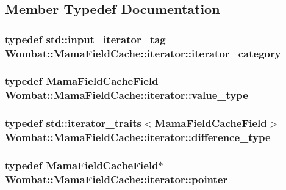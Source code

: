 \subsection{Member Typedef Documentation}
\hypertarget{classWombat_1_1MamaFieldCache_1_1iterator_ab9a965491e48470861289df0bb701009}{
\subsubsection[{iterator\_\-category}]{\setlength{\rightskip}{0pt plus 5cm}typedef std::input\_\-iterator\_\-tag {\bf Wombat::MamaFieldCache::iterator::iterator\_\-category}}}
\label{classWombat_1_1MamaFieldCache_1_1iterator_ab9a965491e48470861289df0bb701009}
\hypertarget{classWombat_1_1MamaFieldCache_1_1iterator_a82b7aadbb750ea23f20f1eb008d5d21d}{
\subsubsection[{value\_\-type}]{\setlength{\rightskip}{0pt plus 5cm}typedef {\bf MamaFieldCacheField} {\bf Wombat::MamaFieldCache::iterator::value\_\-type}}}
\label{classWombat_1_1MamaFieldCache_1_1iterator_a82b7aadbb750ea23f20f1eb008d5d21d}
\hypertarget{classWombat_1_1MamaFieldCache_1_1iterator_aeebd60ba5425667155c47979ee7dd632}{
\subsubsection[{difference\_\-type}]{\setlength{\rightskip}{0pt plus 5cm}typedef std::iterator\_\-traits$<${\bf MamaFieldCacheField}$>$ {\bf Wombat::MamaFieldCache::iterator::difference\_\-type}}}
\label{classWombat_1_1MamaFieldCache_1_1iterator_aeebd60ba5425667155c47979ee7dd632}
\hypertarget{classWombat_1_1MamaFieldCache_1_1iterator_ac974845fb0c4d7a2275fdd32c1c643c6}{
\subsubsection[{pointer}]{\setlength{\rightskip}{0pt plus 5cm}typedef {\bf MamaFieldCacheField}$\ast$ {\bf Wombat::MamaFieldCache::iterator::pointer}}}
